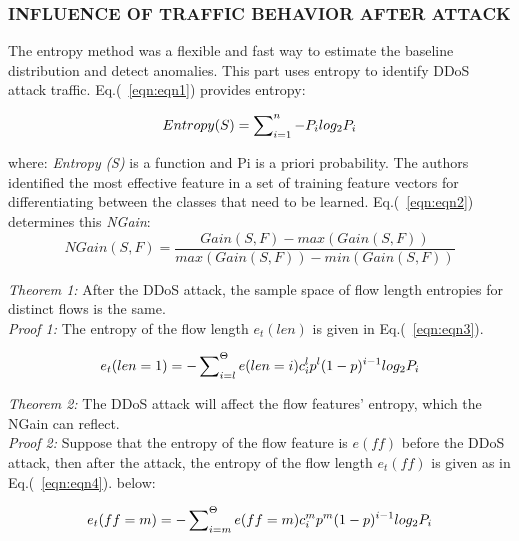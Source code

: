 \documentclass[12pt]{report}
\begin{document}
\subsubsection{INFLUENCE OF TRAFFIC BEHAVIOR AFTER ATTACK}
The entropy method \cite{Rood} was a flexible and fast way to estimate the baseline distribution and detect anomalies. This part uses entropy to identify DDoS attack traffic. Eq.(~\ref{eqn:eqn1}) provides entropy: 

\begin{equation}
    {Entropy(S) = \sum _{i=1}^{n} \nolimits - P_{i} log_{2} P_{i}}
    \label{eqn:eqn1}
\end{equation}

where: \emph{Entropy} \emph{(S)} is a function and Pi is a priori probability. The authors identified the most effective feature in a set of training feature vectors for differentiating between the classes that need to be learned. Eq.(~\ref{eqn:eqn2}) determines this \emph{NGain}: \\

\begin{equation}
    {NGain(S,F) = \frac{Gain(S,F)- max(Gain(S,F))}{max (Gain(S,F)) - min (Gain(S,F))}}
    \label{eqn:eqn2}
\end{equation}

\emph{Theorem 1:} After the DDoS attack, the sample space of flow length entropies for distinct flows is the same.\\

\emph{Proof 1:} The entropy of the flow length $e_{t}(len)$ is given in Eq.(~\ref{eqn:eqn3}).

\begin{equation}
    {e_{t}(len=1) = - \sum _{i=l}^{\Theta} \nolimits e(len = i)c^{l}_{i}p^{l}(1-p)^{i-1}log_{2}P_{i}}
    \label{eqn:eqn3}
\end{equation}

\emph{Theorem 2:} The DDoS attack will affect the flow features' entropy, which the NGain can reflect.\\

\emph{Proof 2:} Suppose that the entropy of the flow feature is $e(ff)$ before the DDoS attack, then after the attack, the entropy of the flow length $e_{t}(ff)$ is given as in Eq.(~\ref{eqn:eqn4}). below:

\begin{equation}
    {e_{t}(ff = m) = - \sum _{i=m}^{\Theta} \nolimits e(ff = m)c^{m}_{i}p^{m}(1-p)^{i-1}log_{2}P_{i}}
    \label{eqn:eqn4}
\end{equation}
\end{document}
